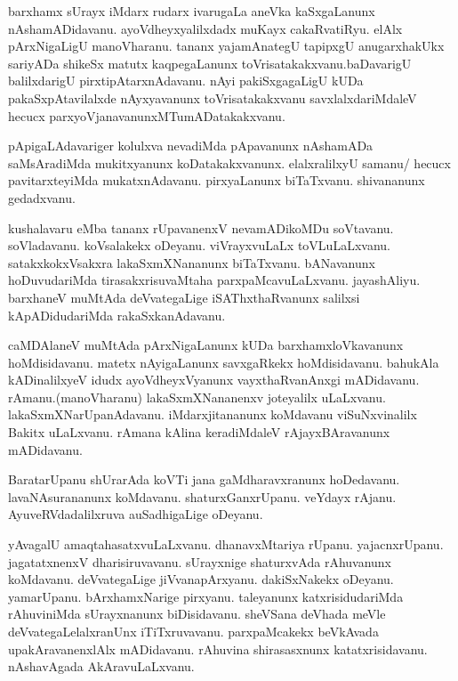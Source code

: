 \documentclass{article}
\begin{document}
\begin{mn}%
barxhamx sUrayx iMdarx rudarx ivarugaLa aneVka kaSxgaLanunx nAshamADidavanu. ayoVdheyxyalilxdadx 
muKayx cakaRvatiRyu. elAlx pArxNigaLigU manoVharanu. tananx yajamAnategU tapipxgU anugarxhakUkx 
sariyADa shikeSx matutx kaqpegaLanunx toVrisatakakxvanu.baDavarigU  balilxdarigU 
pirxtipAtarxnAdavanu. nAyi pakiSxgagaLigU kUDa pakaSxpAtavilalxde nAyxyavanunx toVrisatakakxvanu 
savxlalxdariMdaleV hecucx parxyoVjanavanunxMTumADatakakxvanu.
\end{mn}

\begin{mn}%
pApigaLAdavariger kolulxva nevadiMda pApavanunx nAshamADa saMsAradiMda mukitxyanunx 
koDatakakxvanunx. elalxralilxyU samanu/ hecucx pavitarxteyiMda mukatxnAdavanu. pirxyaLanunx 
biTaTxvanu. shivananunx gedadxvanu.
\end{mn}

\begin{mn}%
kushalavaru eMba tananx rUpavanenxV nevamADikoMDu soVtavanu. soVladavanu. koVsalakekx oDeyanu. 
viVrayxvuLaLx toVLuLaLxvanu. satakxkokxVsakxra lakaSxmXNananunx biTaTxvanu. bANavanunx 
hoDuvudariMda tirasakxrisuvaMtaha parxpaMcavuLaLxvanu. jayashAliyu. barxhaneV muMtAda 
deVvategaLige iSAThxthaRvanunx salilxsi kApADidudariMda rakaSxkanAdavanu.
\end{mn}

\begin{mn}%
caMDAlaneV muMtAda pArxNigaLanunx kUDa barxhamxloVkavanunx hoMdisidavanu. matetx nAyigaLanunx 
savxgaRkekx hoMdisidavanu. bahukAla kADinalilxyeV idudx ayoVdheyxVyanunx vayxthaRvanAnxgi 
mADidavanu. rAmanu.(manoVharanu) lakaSxmXNananenxv joteyalilx uLaLxvanu. lakaSxmXNarUpanAdavanu. 
iMdarxjitananunx koMdavanu viSuNxvinalilx Bakitx uLaLxvanu. rAmana kAlina keradiMdaleV 
rAjayxBAravanunx mADidavanu.
\end{mn}

\begin{mn}%
BaratarUpanu shUrarAda koVTi jana gaMdharavxranunx hoDedavanu. lavaNAsurananunx koMdavanu. 
shaturxGanxrUpanu. veYdayx rAjanu. AyuveRVdadalilxruva auSadhigaLige oDeyanu.
\end{mn}

\begin{mn}%
yAvagalU amaqtahasatxvuLaLxvanu. dhanavxMtariya rUpanu. yajacnxrUpanu. jagatatxnenxV 
dharisiruvavanu. sUrayxnige shaturxvAda rAhuvanunx koMdavanu. deVvategaLige jiVvanapArxyanu. 
dakiSxNakekx oDeyanu. yamarUpanu. bArxhamxNarige pirxyanu. taleyanunx katxrisidudariMda 
rAhuviniMda sUrayxnanunx biDisidavanu. sheVSana deVhada meVle deVvategaLelalxranUnx iTiTxruvavanu. 
parxpaMcakekx beVkAvada upakAravanenxlAlx mADidavanu. rAhuvina shirasasxnunx katatxrisidavanu. 
nAshavAgada AkAravuLaLxvanu.
\end{mn}
\end{document}
